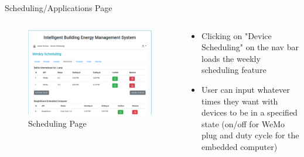 \documentclass{beamer}
\begin{document}
\begin{frame}{Scheduling/Applications Page}{} %

    \begin{columns}
      \begin{figure}
            \centering
            \includegraphics[scale=0.15]{figs/Applications_screen.png}
            \caption{Scheduling Page}
            \label{fig:schedulingl}
        \end{figure}
        \begin{block}{}
          \begin{itemize}
            \item Clicking on "Device Scheduling" on the nav bar loads the weekly scheduling feature
            \item User can input whatever times they want with devices to be in a specified state (on/off for WeMo plug and duty cycle for the embedded computer)
        \end{itemize}
        \end{block}
    \end{columns}
\end{frame}
\end{document}
